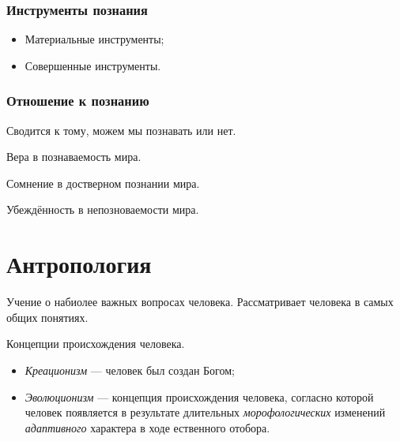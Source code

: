 \subsubsection{Инструменты познания}

\begin{itemize}
	\item Материальные инструменты;
	\item Совершенные инструменты.
\end{itemize}

\subsubsection{Отношение к познанию}

Сводится к тому, можем мы познавать или нет.

\begin{definition}
	Вера в познаваемость мира.
\end{definition}

\begin{definition}[Сцептицизм]
	Сомнение в достверном познании мира.
\end{definition}

\begin{definition}[Агностицизм]
	Убеждённость в непозноваемости мира.
\end{definition}

\section{Антропология}

\begin{definition}
	Учение о набиолее важных вопросах человека. Рассматривает человека в самых
	общих понятиях.
\end{definition}

\begin{definition}[Антропогенез]
	Концепции происхождения человека.

	\begin{itemize}
		\item \emph{Креационизм} --- человек был создан Богом;
		\item \emph{Эволюционизм} --- концепция происхождения человека, согласно
		      которой человек появляется в результате длительных
		      \emph{морофологических} изменений \emph{адаптивного} характера в ходе
		      ественного отобора.
	\end{itemize}
\end{definition}

